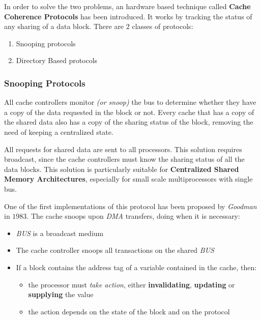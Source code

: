 \documentclass[english]{article}
\begin{document}
\bigskip
In order to solve the two problems, an hardware based technique called \textbf{Cache Coherence Protocols} has been introduced.
It works by tracking the status of any sharing of a data block.
There are \(2\) classes of protocols:

\begin{enumerate}
  \item Snooping protocols
  \item Directory Based protocols
\end{enumerate}

\subsubsection{Snooping Protocols}

All cache controllers monitor \textit{(or snoop)} the bus to determine whether they have a copy of the data requested in the block or not.
Every cache that has a copy of the shared data also has a copy of the sharing status of the block, removing the need of keeping a centralized state.

All requests for shared data are sent to all processors.
This solution requires broadcast, since the cache controllers must know the sharing status of all the data blocks.
This solution is particularly suitable for \textbf{Centralized Shared Memory Architectures}, especially for small scale multiprocessors with single bus.

\bigskip
One of the first implementations of this protocol has been proposed by \textit{Goodman} in \(1983\).
The cache snoops upon \textit{DMA} transfers, doing  when it is necessary:

\begin{itemize}
  \item \textit{BUS} is a broadcast medium
  \item The cache controller snoops all transactions on the shared \textit{BUS}
  \item If a block contains the address tag of a variable contained in the cache, then:
        \begin{itemize}
          \item the processor must \textit{take action}, either \textbf{invalidating}, \textbf{updating} or \textbf{supplying} the value
          \item the action depends on the state of the block and on the protocol
        \end{itemize}
\end{itemize}
\end{document}
